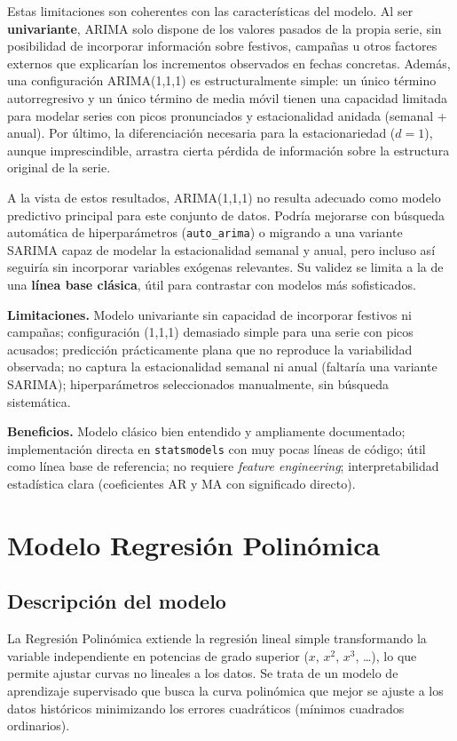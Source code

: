 \documentclass[11pt,a4paper]{article}
\begin{document}
Estas limitaciones son coherentes con las características del modelo. Al ser \textbf{univariante}, ARIMA solo dispone de los valores pasados de la propia serie, sin posibilidad de incorporar información sobre festivos, campañas u otros factores externos que explicarían los incrementos observados en fechas concretas. Además, una configuración ARIMA(1,1,1) es estructuralmente simple: un único término autorregresivo y un único término de media móvil tienen una capacidad limitada para modelar series con picos pronunciados y estacionalidad anidada (semanal + anual). Por último, la diferenciación necesaria para la estacionariedad ($d=1$), aunque imprescindible, arrastra cierta pérdida de información sobre la estructura original de la serie.

A la vista de estos resultados, ARIMA(1,1,1) no resulta adecuado como modelo predictivo principal para este conjunto de datos. Podría mejorarse con búsqueda automática de hiperparámetros (\texttt{auto\_arima}) o migrando a una variante SARIMA capaz de modelar la estacionalidad semanal y anual, pero incluso así seguiría sin incorporar variables exógenas relevantes. Su validez se limita a la de una \textbf{línea base clásica}, útil para contrastar con modelos más sofisticados.

\textbf{Limitaciones.} Modelo univariante sin capacidad de incorporar festivos ni campañas; configuración (1,1,1) demasiado simple para una serie con picos acusados; predicción prácticamente plana que no reproduce la variabilidad observada; no captura la estacionalidad semanal ni anual (faltaría una variante SARIMA); hiperparámetros seleccionados manualmente, sin búsqueda sistemática.

\textbf{Beneficios.} Modelo clásico bien entendido y ampliamente documentado; implementación directa en \texttt{statsmodels} con muy pocas líneas de código; útil como línea base de referencia; no requiere \textit{feature engineering}; interpretabilidad estadística clara (coeficientes AR y MA con significado directo).

\section{Modelo Regresión Polinómica}

\subsection{Descripción del modelo}

La Regresión Polinómica extiende la regresión lineal simple transformando la variable independiente en potencias de grado superior ($x$, $x^2$, $x^3$, \dots), lo que permite ajustar curvas no lineales a los datos. Se trata de un modelo de aprendizaje supervisado que busca la curva polinómica que mejor se ajuste a los datos históricos minimizando los errores cuadráticos (mínimos cuadrados ordinarios).
\end{document}
